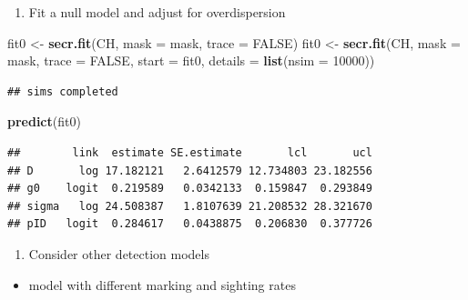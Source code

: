\documentclass[
]{book}
\newenvironment{Shaded}{\begin{snugshade}}{\end{snugshade}}
\newcommand{\AttributeTok}[1]{\textcolor[rgb]{0.13,0.29,0.53}{#1}}
\newcommand{\ConstantTok}[1]{\textcolor[rgb]{0.56,0.35,0.01}{#1}}
\newcommand{\DecValTok}[1]{\textcolor[rgb]{0.00,0.00,0.81}{#1}}
\newcommand{\FunctionTok}[1]{\textcolor[rgb]{0.13,0.29,0.53}{\textbf{#1}}}
\newcommand{\NormalTok}[1]{#1}
\newcommand{\OtherTok}[1]{\textcolor[rgb]{0.56,0.35,0.01}{#1}}
\providecommand{\tightlist}{%
  \setlength{\itemsep}{0pt}\setlength{\parskip}{0pt}}
\begin{document}
\begin{enumerate}
\def\labelenumi{\arabic{enumi}.}
\setcounter{enumi}{6}
\tightlist
\item
  Fit a null model and adjust for overdispersion
\end{enumerate}

\begin{Shaded}
\begin{Highlighting}[]
\NormalTok{fit0 }\OtherTok{\textless{}{-}} \FunctionTok{secr.fit}\NormalTok{(CH, }\AttributeTok{mask =}\NormalTok{ mask, }\AttributeTok{trace =} \ConstantTok{FALSE}\NormalTok{)}
\NormalTok{fit0 }\OtherTok{\textless{}{-}} \FunctionTok{secr.fit}\NormalTok{(CH, }\AttributeTok{mask =}\NormalTok{ mask, }\AttributeTok{trace =} \ConstantTok{FALSE}\NormalTok{, }\AttributeTok{start =}\NormalTok{ fit0, }
                 \AttributeTok{details =} \FunctionTok{list}\NormalTok{(}\AttributeTok{nsim =} \DecValTok{10000}\NormalTok{))}
\end{Highlighting}
\end{Shaded}

\begin{verbatim}
## sims completed
\end{verbatim}

\begin{Shaded}
\begin{Highlighting}[]
\FunctionTok{predict}\NormalTok{(fit0)}
\end{Highlighting}
\end{Shaded}

\begin{verbatim}
##        link  estimate SE.estimate       lcl       ucl
## D       log 17.182121   2.6412579 12.734803 23.182556
## g0    logit  0.219589   0.0342133  0.159847  0.293849
## sigma   log 24.508387   1.8107639 21.208532 28.321670
## pID   logit  0.284617   0.0438875  0.206830  0.377726
\end{verbatim}

\begin{enumerate}
\def\labelenumi{\arabic{enumi}.}
\setcounter{enumi}{7}
\tightlist
\item
  Consider other detection models
\end{enumerate}

\begin{itemize}
\tightlist
\item
  model with different marking and sighting rates
\end{itemize}
\end{document}
